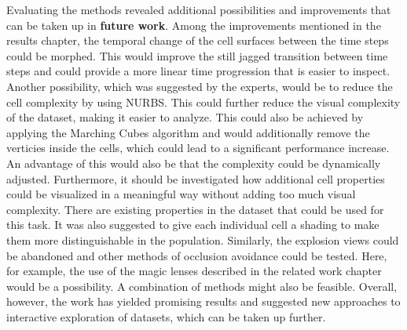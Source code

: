 Evaluating the methods revealed additional possibilities and improvements that can be taken up in \textbf{future work}. Among the improvements mentioned in the results chapter, the temporal change of the cell surfaces between the time steps could be morphed. This would improve the still jagged transition between time steps and could provide a more linear time progression that is easier to inspect. Another possibility, which was suggested by the experts, would be to reduce the cell complexity by using NURBS. %
This could further reduce the visual complexity of the dataset, making it easier to analyze. This could also be achieved by applying the Marching Cubes algorithm and would additionally remove the verticies inside the cells, which could lead to a significant performance increase. An advantage of this would also be that the complexity could be dynamically adjusted.
Furthermore, it should be investigated how additional cell properties could be visualized in a meaningful way without adding too much visual complexity. There are existing properties in the dataset that could be used for this task. It was also suggested to give each individual cell a shading to make them more distinguishable in the population. 
Similarly, the explosion views could be abandoned and other methods of occlusion avoidance could be tested. Here, for example, the use of the magic lenses described in the related work chapter would be a possibility. A combination of methods might also be feasible.
Overall, however, the work has yielded promising results and suggested new approaches to interactive exploration of datasets, which can be taken up further.